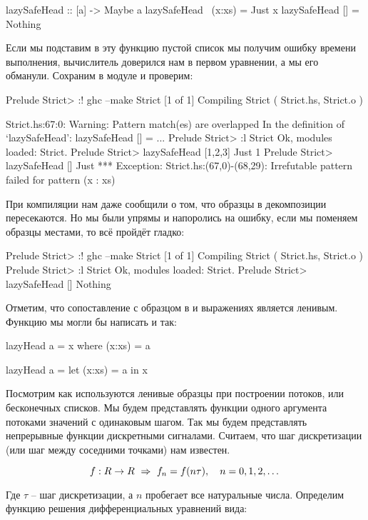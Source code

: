 \begin{code}
lazySafeHead :: [a] -> Maybe a
lazySafeHead ~(x:xs) = Just x
lazySafeHead []      = Nothing   
\end{code}

Если мы подставим в эту функцию пустой список мы получим 
ошибку времени выполнения, вычислитель доверился нам в первом
уравнении, а мы его обманули. Сохраним в модуле 
и проверим:

\begin{code}
Prelude Strict> :! ghc --make Strict
[1 of 1] Compiling Strict           ( Strict.hs, Strict.o )

Strict.hs:67:0:
    Warning: Pattern match(es) are overlapped
             In the definition of `lazySafeHead': lazySafeHead [] = ...
Prelude Strict> :l Strict
Ok, modules loaded: Strict.
Prelude Strict> lazySafeHead [1,2,3]
Just 1
Prelude Strict> lazySafeHead []
Just *** Exception: Strict.hs:(67,0)-(68,29): Irrefutable 
pattern failed for pattern (x : xs)
\end{code}

При компиляции нам даже сообщили о том, что образцы в декомпозиции
пересекаются. Но мы были упрямы и напоролись на ошибку, если мы поменяем
образцы местами, то всё пройдёт гладко:

\begin{code}
Prelude Strict> :! ghc --make Strict
[1 of 1] Compiling Strict           ( Strict.hs, Strict.o )
Prelude Strict> :l Strict
Ok, modules loaded: Strict.
Prelude Strict> lazySafeHead []
Nothing
\end{code}

Отметим, что сопоставление с образцом в  и  
выражениях является ленивым. Функцию  
мы могли бы написать и так:

\begin{code}
lazyHead a = x
    where (x:xs) = a

lazyHead a = 
    let (x:xs) = a
    in  x
\end{code}

Посмотрим как используются ленивые образцы при построении
потоков, или бесконечных списков.
Мы будем представлять функции одного аргумента потоками
значений с одинаковым шагом. Так мы будем представлять 
непрерывные функции дискретными сигналами. Считаем, что
шаг дискретизации (или шаг между соседними точками) нам известен.

\[  f : R \rightarrow R \ \Rightarrow \ f_n = f(n \tau),\quad n = 0,1,2,\dots \]

Где $\tau$ -- шаг дискретизации, а $n$ пробегает все
натуральные числа.
Определим функцию решения дифференциальных уравнений вида:

